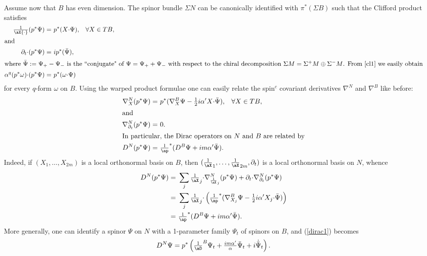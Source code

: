 \documentclass[12pt]{amsart}
\begin{document}
Assume now that $B$ has even dimension.
The spinor bundle $\Sigma N$ can be canonically identified with
$\pi^*(\Sigma B)$ such  
that the Clifford product satisfies  
\begin{align}\label{cl1}
\tfrac{1}\aX{{\cdot}}(p^*{\Psi})=&\ p^*(X{{\cdot}}{\Psi}),&&\forall  X\in TB,\\
\intertext{and}
\label{cl2} {{\partial_t}}{{\cdot}}(p^*{\Psi})=&\ ip^*(\bar{\Psi}),\\
\intertext{where $\bar{\Psi}:={\Psi}_+-{\Psi}_-$ is the ``conjugate" of
  ${\Psi}={\Psi}_++{\Psi}_-$ with respect to the chiral decomposition $\Sigma
  M=\Sigma ^+M\oplus \Sigma ^-M$.
   From \eqref{cl1} we easily obtain}
\label{cl3}{\alpha}^q(p ^*\omega){{\cdot}}(p^*{\Psi})=&\ p^*(\omega{{\cdot}}{\Psi})
\end{align}
for every $q$-form $\omega$ on $B$. 
Using the warped product formulae
one can easily relate the spin$^c$ covariant derivatives ${\nabla}^N$ and
${\nabla}^B$ like before:
\begin{align}{\nabla}^N_X(p^*{\Psi})=&\ p^*({\nabla}^B_{X}{\Psi}-
  \tfrac{1}{2}i{\alpha}'X{{\cdot}}\bar{\Psi}),&& \forall X\in TB,\\
\intertext{and}
{\nabla}^N_{{\partial_t}}(p^*{\Psi})=&\ 0.\\
\intertext{In particular, the Dirac operators on $N$ and $B$ are related by}
\label{dirac1}
  D^N(p^*{\Psi})=&\ \tfrac{1}\ap^*(D^B{\Psi}+im{\alpha}'\bar{\Psi}).
\end{align}
Indeed, if $(X_1,\ldots,X_{2m})$ is a local orthonormal basis on $B$,
then $(\frac{1}\aX_1,\ldots,\frac{1}\aX_{2m},{{\partial_t}})$ is a local
orthonormal basis on $N$, whence
\begin{align*}  
D^N(p^*{\Psi})=&\ \sum_j \tfrac{1}\aX_j{{\cdot}}{\nabla}^N_{\frac{1}\aX_j}(p ^*\Psi)
+{{\partial_t}}{{\cdot}}{\nabla}^N_{{\partial_t}}(p^*{\Psi})\\
=&\ \sum_j
\tfrac{1}\aX_j{{\cdot}}\left(\tfrac{1}\ap^*({\nabla}^B_{X_j}{\Psi}-
\tfrac{1}{2}i{\alpha}'X_j{{\cdot}}\bar{\Psi})\right)\\
=&\ \tfrac{1}\ap^*(D^B{\Psi}+im{\alpha}'\bar{\Psi}).
\end{align*}
More generally, one can identify a spinor $\Psi$ on $N$ with a
1-parameter family ${\Psi}_t$ of spinors on $B$, and  (\ref{dirac1})
becomes
\begin{equation}\label{dirac2}
  D^N{\Psi}=p^*\left(\tfrac{1}\aD^B{\Psi}_t+
\tfrac{im{\alpha}'}{\alpha}\bar{\Psi}_t+i{\dot{\bar{\Psi}}_t}\right). 
\end{equation}
\end{document}
